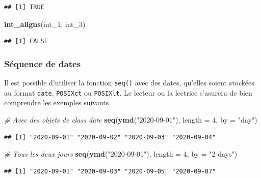 \documentclass[
  11pt,
]{book}
\newenvironment{Shaded}{\begin{snugshade}}{\end{snugshade}}
\newcommand{\CommentTok}[1]{\textcolor[rgb]{0.56,0.35,0.01}{\textit{#1}}}
\newcommand{\DataTypeTok}[1]{\textcolor[rgb]{0.13,0.29,0.53}{#1}}
\newcommand{\DecValTok}[1]{\textcolor[rgb]{0.00,0.00,0.81}{#1}}
\newcommand{\KeywordTok}[1]{\textcolor[rgb]{0.13,0.29,0.53}{\textbf{#1}}}
\newcommand{\NormalTok}[1]{#1}
\newcommand{\StringTok}[1]{\textcolor[rgb]{0.31,0.60,0.02}{#1}}
\numberwithin{equation}{section}
\numberwithin{countremarque}{section}
\begin{document}
\begin{lstlisting}
## [1] TRUE
\end{lstlisting}

\begin{Shaded}
\begin{Highlighting}[]
\KeywordTok{int\_aligns}\NormalTok{(int\_}\DecValTok{1}\NormalTok{, int\_}\DecValTok{3}\NormalTok{)}
\end{Highlighting}
\end{Shaded}

\begin{lstlisting}
## [1] FALSE
\end{lstlisting}

\hypertarget{suxe9quence-de-dates}{%
\subsubsection{Séquence de dates}\label{suxe9quence-de-dates}}

Il est possible d'utiliser la fonction \texttt{seq()} avec des dates, qu'elles soient stockées au format \texttt{date}, \texttt{POSIXct} ou \texttt{POSIXlt}. Le lecteur ou la lectrice s'asurera de bien comprendre les exemples suivants.

\begin{Shaded}
\begin{Highlighting}[]
\CommentTok{\# Avec des objets de class date}
\KeywordTok{seq}\NormalTok{(}\KeywordTok{ymd}\NormalTok{(}\StringTok{"2020{-}09{-}01"}\NormalTok{), }\DataTypeTok{length =} \DecValTok{4}\NormalTok{, }\DataTypeTok{by =} \StringTok{"day"}\NormalTok{) }
\end{Highlighting}
\end{Shaded}

\begin{lstlisting}
## [1] "2020-09-01" "2020-09-02" "2020-09-03" "2020-09-04"
\end{lstlisting}

\begin{Shaded}
\begin{Highlighting}[]
\CommentTok{\# Tous les deux jours}
\KeywordTok{seq}\NormalTok{(}\KeywordTok{ymd}\NormalTok{(}\StringTok{"2020{-}09{-}01"}\NormalTok{), }\DataTypeTok{length =} \DecValTok{4}\NormalTok{, }\DataTypeTok{by =} \StringTok{"2 days"}\NormalTok{) }
\end{Highlighting}
\end{Shaded}

\begin{lstlisting}
## [1] "2020-09-01" "2020-09-03" "2020-09-05" "2020-09-07"
\end{lstlisting}
\end{document}
